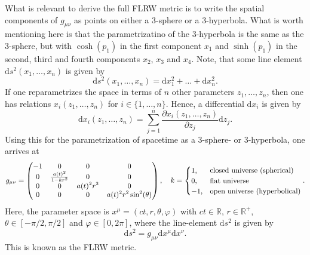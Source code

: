 \documentclass[a4paper,11pt]{article}
\numberwithin{equation}{section}
\begin{document}
What is relevant to derive the full FLRW metric is to write the spatial components of $g_{\mu\nu}$ as points on either a 3-sphere or a 3-hyperbola. What is worth mentioning here is that the parametrizatino of the 3-hyperbola is the same as the 3-sphere, but with $\cosh(p_1)$ in the first component $x_1$ and $\sinh(p_1)$ in the second, third and fourth components $x_2$, $x_3$ and $x_4$. Note, that some line element $\mathrm{d}s^2(x_1,\dots,x_n)$ is given by \begin{equation}
	\mathrm{d}s^2(x_1,\dots,x_n) = \mathrm{d}x_1^2 + \dots + \mathrm{d}x_n^2.
\end{equation} If one reparametrizes the space in terms of $n$ other parameters $z_1,\dots,z_n$, then one has relations $x_i(z_1,\dots,z_n)$ for $i\in \{1,\dots,n\}$. Hence, a differential $\mathrm{d}x_i$ is given by \begin{equation}
\mathrm{d}x_i(z_1,\dots,z_n) = \sum_{j=1}^n\frac{\partial x_i(z_1,\dots,z_n)}{\partial z_j}\mathrm{d}z_j.
\end{equation} Using this for the parametrization of spacetime as a 3-sphere- or 3-hyperbola, one arrives at \begin{align}\small\begin{aligned}
g_{\mu\nu} = \begin{pmatrix}
	-1 & 0 & 0 & 0 \\
	0 & \frac{a(t)^2}{1-kr^2} & 0 & 0 \\
	0 & 0 & a(t)^2 r^2 & 0 \\
	0 & 0 & 0 & a(t)^2 r^2 \sin^2(\theta)
\end{pmatrix}, \quad k = \begin{cases}
1, & \text{closed universe (spherical)} \\
0, & \text{flat universe} \\
-1, & \text{open universe (hyperbolical)}
\end{cases}.
\end{aligned}\end{align} Here, the parameter space is $x^\mu = (ct, r, \theta, \varphi)$ with $ct \in \mathbb{R}$, $r \in \mathbb{R}^+$, $\theta \in [-\pi/2, \pi/2]$ and $\varphi \in [0, 2\pi]$, where the line-element $\mathrm{d}s^2$ is given by \begin{equation}
\mathrm{d}s^2 = g_{\mu\nu}\mathrm{d}x^\mu \mathrm{d}x^\nu.
\end{equation} This is known as the FLRW metric.
\end{document}
